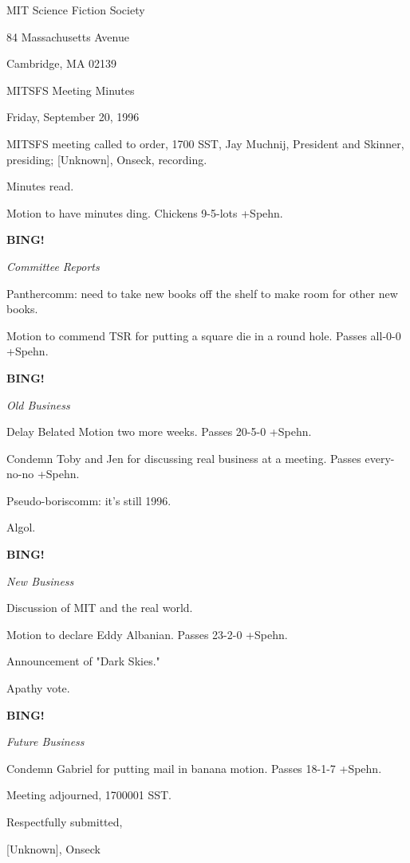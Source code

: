 \documentclass[12pt]{article}
\newcommand{\bing}{{\bf BING!} }
\newcommand{\goto}[1]{\bing \vskip 12pt \centerline{{\em{#1}}}}
\begin{document}
\begin{center}

MIT Science Fiction Society 

84 Massachusetts Avenue

Cambridge, MA 02139

\vspace{12pt}

MITSFS Meeting Minutes 

Friday, September 20, 1996

\end{center}
 
\vspace{18pt}

\setlength{\parskip}{6pt}

\noindent
MITSFS meeting called to order, 1700 SST,
Jay Muchnij, President and Skinner, presiding; [Unknown], Onseck, recording.

Minutes read.

Motion to have minutes ding. Chickens 9-5-lots +Spehn.

\goto{Committee Reports}

Panthercomm: need to take new books off the shelf to make room for other new books.

Motion to commend TSR for putting a square die in a round hole. Passes all-0-0 +Spehn.

\goto{Old Business}

Delay Belated Motion two more weeks. Passes 20-5-0 +Spehn.

Condemn Toby and Jen for discussing real business at a meeting. Passes every-no-no +Spehn.

Pseudo-boriscomm: it's still 1996.

Algol.

\goto{New Business}

Discussion of MIT and the real world.

Motion to declare Eddy Albanian. Passes 23-2-0 +Spehn.

Announcement of "Dark Skies."

Apathy vote.

\goto{Future Business}

Condemn Gabriel for putting mail in banana motion. Passes 18-1-7 +Spehn.

\vspace{12pt}

\noindent
Meeting adjourned, 1700001 SST.

\vspace{18pt}

\centerline{Respectfully submitted,}
\centerline{[Unknown], Onseck}
\end{document}
